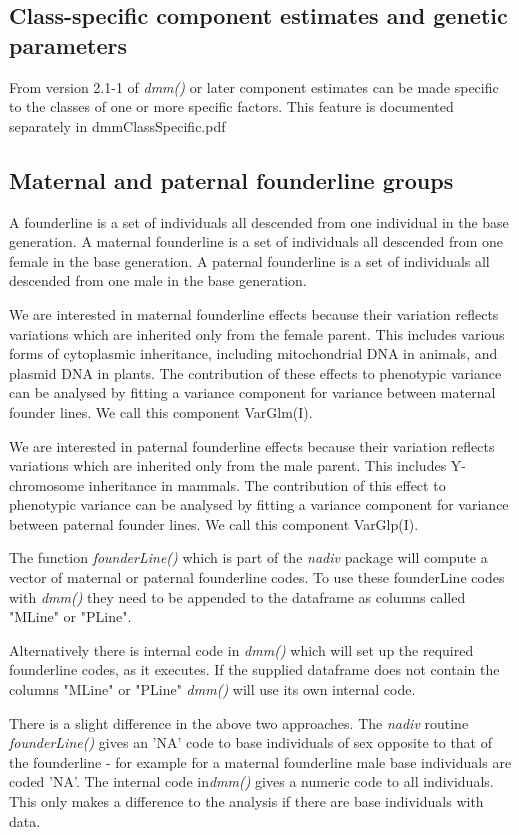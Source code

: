 \documentclass[titlepage]{article}  %
\begin{document}
\subsection{Class-specific component estimates and genetic parameters}
 From version 2.1-1 of {\em dmm()} or later component estimates  can be made specific to the classes of one or more specific factors. This feature is documented separately in dmmClassSpecific.pdf~\cite{jack:17}

\subsection{Maternal and paternal founderline groups}
A founderline  is a set of individuals all descended from one individual in the base generation. A maternal founderline is a set of individuals  all descended from one female in the base generation. A paternal founderline is a set of individuals  all descended from one male in the base generation.

We are interested in maternal founderline effects because their variation reflects variations which are inherited only from the female parent. This includes various forms of cytoplasmic inheritance, including mitochondrial DNA in animals, and plasmid DNA in plants. The contribution of these effects to phenotypic variance can be analysed by fitting a variance component for variance between maternal founder lines. We call this component VarGlm(I).

We are interested in paternal founderline effects because their variation reflects variations which are inherited only from the male parent. This includes Y-chromosome inheritance in mammals. The contribution of this effect to phenotypic variance can be analysed by fitting a variance component for variance between paternal founder lines. We call this component VarGlp(I).

The function {\em founderLine()} which is part of the {\em nadiv} package will compute a vector of maternal or paternal founderline codes. To use these founderLine codes with {\em dmm()} they need to be appended to the dataframe as columns called "MLine" or "PLine". 

Alternatively there is internal code in {\em dmm()} which will set up the required founderline codes, as it executes. If the supplied dataframe does not contain the columns "MLine" or "PLine" {\em dmm()} will use its own internal code. 

There is a slight difference in the above two approaches.  The {\em nadiv} routine {\em founderLine()} gives an 'NA' code to base individuals of sex opposite to that of the founderline - for example for a maternal founderline male base individuals are coded 'NA'. The internal code in{\em dmm()} gives a numeric code to all individuals.  This only makes a difference to the analysis if there are base individuals with data. 
\end{document}
